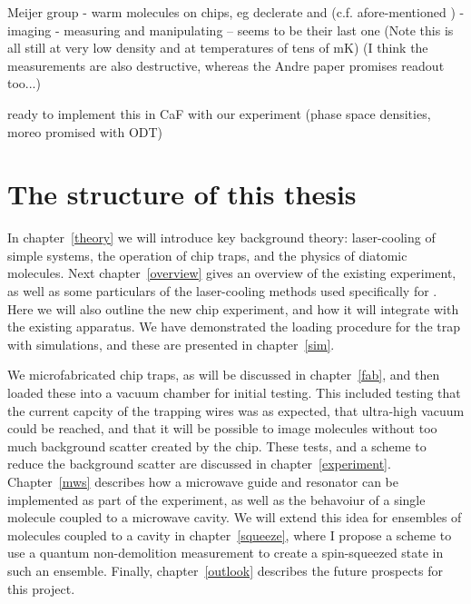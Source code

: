 Meijer group
- warm molecules on chips, eg declerate \cite{Meek2008} and \cite{Meek2009}
(c.f. afore-mentioned \cite{Bethlem1999})
- imaging \cite{Marx2013}
- measuring and manipulating \cite{PhysRevA.92.063408} -- seems to be their
last one
(Note this is all still at very low density and at temperatures of tens of mK)
(I think the measurements are also destructive, whereas the Andre paper
promises readout too...)


ready to implement this in CaF with our experiment (phase space densities,
moreo promised with ODT)

\section{The structure of this thesis}

In chapter~\ref{theory} we will introduce key background theory: 
laser-cooling of simple systems, the operation of chip traps, and the physics
of diatomic molecules. Next chapter~\ref{overview} gives an overview of the
existing \CaF{} experiment, as well as some particulars of the laser-cooling
methods used specifically for \CaF{}. Here we will also outline the new chip
experiment, and how it will integrate with the existing apparatus. We have
demonstrated the loading procedure for the trap with simulations, and these are
presented in chapter~\ref{sim}.

We microfabricated chip traps, as will be discussed in chapter~\ref{fab}, and
then loaded these into a vacuum chamber for initial testing. This included
testing that the current capcity of the trapping wires was as expected, that
ultra-high vacuum could be reached, and that it will be possible to image
molecules without too much background scatter created by the chip. These tests,
and a scheme to reduce the background scatter are discussed in
chapter~\ref{experiment}. Chapter~\ref{mws} describes how a microwave guide and
resonator can be implemented as part of the experiment, as well as the
behavoiur of a single molecule coupled to a microwave cavity. We will extend
this idea for ensembles of molecules coupled to a cavity in
chapter~\ref{squeeze}, where I propose a scheme to use a quantum non-demolition
measurement to create a spin-squeezed state in such an ensemble. Finally,
chapter~\ref{outlook} describes the future prospects for this project.

